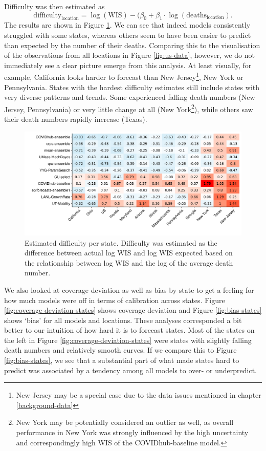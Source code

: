 \documentclass[
]{book}
\begin{document}
Difficulty was then estimated as
\[\text{difficulty}_{\text{location}} = \log(\text{WIS}) - (\beta_0 + \beta_1 \cdot \log(\text{deaths}_{\text{location}}).\]
The results are shown in Figure \ref{fig:dfficulty-states}. We can see that indeed models consistently struggled with some states, whereas others seem to have been easier to predict than expected by the number of their deaths. Comparing this to the visualisation of the observations from all locations in Figure \ref{fig:us-data}, however, we do not immediately see a clear picture emerge from this analysis. At least visually, for example, California looks harder to forecast than New Jersey\footnote{New Jersey may be a special case due to the data issues mentioned in chapter \ref{background-data}}, New York or Pennsylvania. States with the hardest difficulty estimates still include states with very diverse patterns and trends. Some experienced falling death numbers (New Jersey, Pennsylvania) or very little change at all (New York\footnote{New York may be potentially considered an outlier as well, as overall performance in New York was strongly influenced by the high uncertainty and correspondingly high WIS of the COVIDhub-baseline model.}), while others saw their death numbers rapidly increase (Texas).

\begin{figure}
\includegraphics[width=1\linewidth]{../visualisation/chapter-5-results/scenario-baseline/difficulty-states-heatmap} \caption{Estimated difficulty per state. Difficulty was estimated as the difference between actual log WIS and log WIS expected based on the relationship between log WIS and the log of the average death number.}\label{fig:dfficulty-states}
\end{figure}

We also looked at coverage deviation as well as bias by state to get a feeling for how much models were off in terms of calibration across states. Figure \ref{fig:coverage-deviation-states} shows coverage deviation and Figure \ref{fig:bias-states} shows `bias' for all models and locations. These analyses corresponded a bit better to our intuition of how hard it is to forecast states. Most of the states on the left in Figure \ref{fig:coverage-deviation-states} were states with slightly falling death numbers and relatively smooth curves. If we compare this to Figure \ref{fig:bias-states}, we see that a substantial part of what made states hard to predict was associated by a tendency among all models to over- or underpredict.
\end{document}
